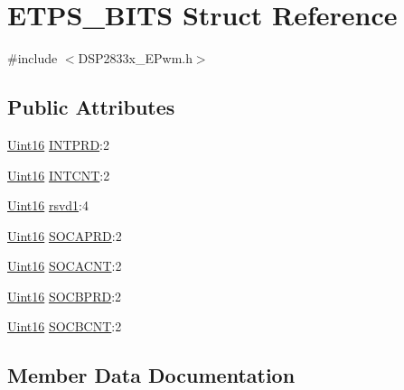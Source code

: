 \hypertarget{struct_e_t_p_s___b_i_t_s}{}\section{E\+T\+P\+S\+\_\+\+B\+I\+T\+S Struct Reference}
\label{struct_e_t_p_s___b_i_t_s}


{\ttfamily \#include $<$D\+S\+P2833x\+\_\+\+E\+Pwm.\+h$>$}

\subsection*{Public Attributes}
\begin{DoxyCompactItemize}
\item 
\hyperlink{_d_s_p2833x___device_8h_a59a9f6be4562c327cbfb4f7e8e18f08b}{Uint16} \hyperlink{struct_e_t_p_s___b_i_t_s_a99fda2d93192fcf2336c9a672c41af92}{I\+N\+T\+P\+R\+D}\+:2
\item 
\hyperlink{_d_s_p2833x___device_8h_a59a9f6be4562c327cbfb4f7e8e18f08b}{Uint16} \hyperlink{struct_e_t_p_s___b_i_t_s_af1069f0eb329f7019a1ed5cb6e94f019}{I\+N\+T\+C\+N\+T}\+:2
\item 
\hyperlink{_d_s_p2833x___device_8h_a59a9f6be4562c327cbfb4f7e8e18f08b}{Uint16} \hyperlink{struct_e_t_p_s___b_i_t_s_ac4375d150d419bf2235a9e6616f605ee}{rsvd1}\+:4
\item 
\hyperlink{_d_s_p2833x___device_8h_a59a9f6be4562c327cbfb4f7e8e18f08b}{Uint16} \hyperlink{struct_e_t_p_s___b_i_t_s_af674d62b3748023e0d40afdfb03e9542}{S\+O\+C\+A\+P\+R\+D}\+:2
\item 
\hyperlink{_d_s_p2833x___device_8h_a59a9f6be4562c327cbfb4f7e8e18f08b}{Uint16} \hyperlink{struct_e_t_p_s___b_i_t_s_a98b843a9627afc41c5aeea8887cab3e7}{S\+O\+C\+A\+C\+N\+T}\+:2
\item 
\hyperlink{_d_s_p2833x___device_8h_a59a9f6be4562c327cbfb4f7e8e18f08b}{Uint16} \hyperlink{struct_e_t_p_s___b_i_t_s_aae6da719ccf98a207a587d44a0ec19a5}{S\+O\+C\+B\+P\+R\+D}\+:2
\item 
\hyperlink{_d_s_p2833x___device_8h_a59a9f6be4562c327cbfb4f7e8e18f08b}{Uint16} \hyperlink{struct_e_t_p_s___b_i_t_s_a58e50ab18d578b332587f16acf765d81}{S\+O\+C\+B\+C\+N\+T}\+:2
\end{DoxyCompactItemize}


\subsection{Member Data Documentation}
\hypertarget{struct_e_t_p_s___b_i_t_s_af1069f0eb329f7019a1ed5cb6e94f019}{}
